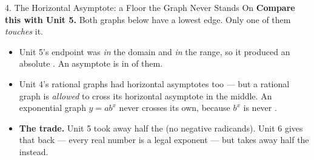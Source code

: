 \documentclass[10pt]{article}
\newcommand{\lgrid}[4]{%
  \draw[step=1, linegray!40, very thin] (#1,#3) grid (#2,#4);
  \draw[->, semithick, charcoal] (#1,0)--(#2,0) node[below right, font=\scriptsize]{$x$};
  \draw[->, semithick, charcoal] (0,#3)--(0,#4) node[left, font=\scriptsize]{$y$};}
\newcommand{\expcurve}[4]{\draw[very thick, forest, domain=#3:#4, samples=120, smooth]
  plot (\x,{#1*exp((#2)*(\x))});}
\begin{document}
\begin{notesbox}{4. The Horizontal Asymptote: a Floor the Graph Never Stands On}
\vspace{3pt}
\textbf{Compare this with Unit 5.} Both graphs below have a lowest edge. Only one of them
\emph{touches} it.
\begin{center}
\end{center}
\begin{itemize}[leftmargin=1.5em, itemsep=3pt]
  \item Unit 5's endpoint was \emph{in} the domain and \emph{in} the range, so it produced an
        absolute . An asymptote is in  of them.
  \item Unit 4's rational graphs had horizontal asymptotes too --- but a rational graph is
        \emph{allowed} to cross its horizontal asymptote in the middle. An exponential graph
        $y=ab^{x}$ never crosses its own, because $b^{x}$ is never .
  \item \textbf{The trade.} Unit 5 took away half the  (no negative radicands). Unit 6
        gives that back --- every real number is a legal exponent --- but takes away half the
         instead.
\end{itemize}
\end{notesbox}
\end{document}
